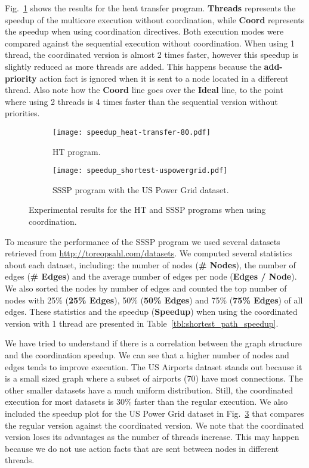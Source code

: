 Fig.~\ref{exp:heat-transfer} shows the results for the heat transfer program. \textbf{Threads} represents the speedup of the multicore execution
without coordination, while \textbf{Coord} represents the speedup when using coordination directives.
Both execution modes were compared against the sequential execution without coordination.
When using 1 thread, the coordinated version is almost 2 times
faster, however this speedup is slightly reduced as more threads are added. This happens because the \textbf{add-priority} action fact is ignored
when it is sent to a node located in a different thread.
Also note how the \textbf{Coord} line goes over the \textbf{Ideal} line, to the point where using 2 threads is 4 times faster than the sequential
version without priorities.

\begin{figure}[h!]
     \centering
   \begin{subfigure}[b]{0.4\textwidth}
      \texttt{[image: speedup\_heat-transfer-80.pdf]}
      \caption{HT program.\newline}\label{exp:heat-transfer}
   \end{subfigure}
   \begin{subfigure}[b]{0.4\textwidth}
      \texttt{[image: speedup\_shortest-uspowergrid.pdf]}
      \caption{SSSP program with the US Power Grid dataset.}\label{exp:sssp-uspowergrid}
   \end{subfigure}
   \caption{Experimental results for the HT and SSSP programs when using coordination.}
\end{figure}

To measure the performance of the SSSP program we used several datasets retrieved from \url{http://toreopsahl.com/datasets}. We computed several
statistics about each dataset, including: the number of nodes (\textbf{\# Nodes}), the number of edges (\textbf{\# Edges}) and
the average number of edges per node (\textbf{Edges / Node}). We also sorted the nodes by number of edges and counted the top number of nodes
with 25\% (\textbf{25\% Edges}), 50\% (\textbf{50\% Edges}) and 75\% (\textbf{75\% Edges}) of all edges.
These statistics and the speedup (\textbf{Speedup}) when using the coordinated version with 1 thread are presented in Table~\ref{tbl:shortest_path_speedup}.

We have tried to understand if there is a correlation between the graph structure and the coordination speedup. We can see that a higher number
of nodes and edges tends to improve execution. The US Airports dataset stands out because it is a small sized graph where a subset of airports
(70) have most connections. The other smaller datasets have a much uniform distribution.
Still, the coordinated execution for most datasets is 30\% faster than the regular execution. We also included the speedup plot
for the US Power Grid dataset in Fig.~\ref{exp:sssp-uspowergrid} that compares the regular version against the coordinated version.
We note that the coordinated version loses its advantages as the number of threads increase. This may happen because we do not
use action facts that are sent between nodes in different threads.

